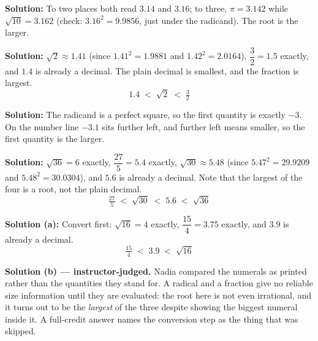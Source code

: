 \documentclass[12pt]{article}
\begin{document}
\textbf{Solution:} \quad To two places both read $3.14$ and $3.16$; to three,
$\pi = 3.142$ while $\sqrt{10} = 3.162$ (check: $3.16^2 = 9.9856$, just under the
radicand). The root is the larger. \ans{<}


\textbf{Solution:} \quad $\sqrt{2} \approx 1.41$ (since $1.41^2 = 1.9881$ and
$1.42^2 = 2.0164$), $\dfrac{3}{2} = 1.5$ exactly, and $1.4$ is already a decimal. The plain
decimal is smallest, and the fraction is largest.
\[ \boxed{1.4 \;<\; \sqrt{2} \;<\; \tfrac{3}{2}} \]


\textbf{Solution:} \quad The radicand is a perfect square, so the first quantity is exactly
$-3$. On the number line $-3.1$ sits further left, and further left means smaller, so the
first quantity is the larger. \ans{>}


\textbf{Solution:} \quad $\sqrt{36} = 6$ exactly, $\dfrac{27}{5} = 5.4$ exactly,
$\sqrt{30} \approx 5.48$ (since $5.47^2 = 29.9209$ and $5.48^2 = 30.0304$), and $5.6$ is
already a decimal. Note that the largest of the four is a root, not the plain decimal.
\[ \boxed{\tfrac{27}{5} \;<\; \sqrt{30} \;<\; 5.6 \;<\; \sqrt{36}} \]


\textbf{Solution (a):} \quad Convert first: $\sqrt{16} = 4$ exactly, $\dfrac{15}{4} = 3.75$
exactly, and $3.9$ is already a decimal.
\[ \boxed{\tfrac{15}{4} \;<\; 3.9 \;<\; \sqrt{16}} \]

\textbf{Solution (b) --- instructor-judged.} \quad Nadia compared the numerals as printed
rather than the quantities they stand for. A radical and a fraction give no reliable size
information until they are evaluated: the root here is not even irrational, and it turns out
to be the \emph{largest} of the three despite showing the biggest numeral inside it. A
full-credit answer names the conversion step as the thing that was skipped.
\end{document}
